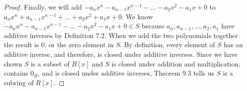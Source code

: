 \documentclass[11 pt]{article}
\newcommand{\newpar}{\vspace{.15in}\noindent}
\begin{document}
\begin{proof}
  \newpar
  Finally, we will add $-a_nx^n-a_{n-1}x^{n-1}-. . .-a_2x^2-a_1x+0$ to $a_nx^n+a_{n-1}x^{n-1}+. . .+a_2x^2+a_1x+0$. We know $-a_nx^n-a_{n-1}x^{n-1}-. . .-a_2x^2-a_1x+0\in S$ because $a_n,a_{n-1},. . . ,a_2,a_1$ have additive inverses by Definition 7.2. When we add the two polynomials together the result is 0, or the zero element in $S$. By definition, every element of $S$ has an additive inverse, and therefore, is closed under additive inverses. Since we have shown $S$ is a subset of $R[x]$ and $S$ is closed under addition and multiplication, contains $0_R$, and is closed under additive inverses, Theorem 9.3 tells us $S$ is a subring of $R[x]$.
\end{proof}
\end{document}
